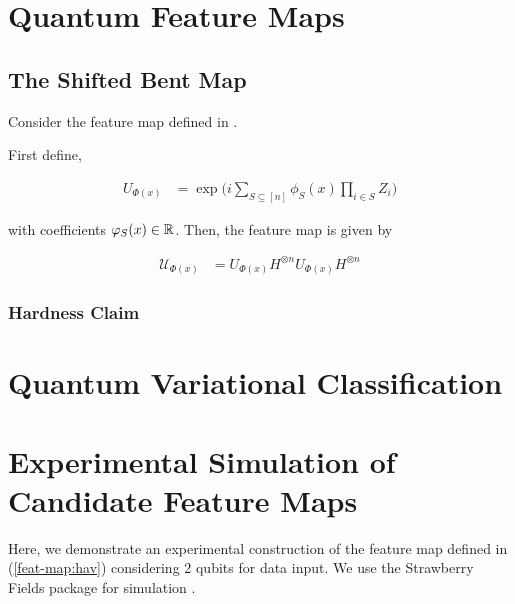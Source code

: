 \documentclass[main.tex]{subfiles}
\begin{document}
\section{Quantum Feature Maps}

\subsection{The Shifted Bent Map}

Consider the feature map defined in \cite{havlicek2018supervised}.

First define,

\begin{align*}
U_{\Phi(x)} &= \exp\Big(i \sum_{S \subseteq [n]} \phi_S(x) \prod_{i \in S} Z_i \Big)	
\end{align*}

with coefficients $\varphi_S(x) \in \mathbb{R}$. Then, the feature map is given by 


\begin{align}
\label{feat-map:hav}
\mathcal{U}_{\Phi(x)} &= U_{\Phi(x)} H^{\otimes n} U_{\Phi(x)} H^{\otimes n}
\end{align}


\subsubsection{Hardness Claim}

\section{Quantum Variational Classification}

%
%
%
\section{Experimental Simulation of Candidate Feature Maps}

Here, we demonstrate an experimental construction of the feature map defined in (\ref{feat-map:hav}) considering 2 qubits for data input. We use the Strawberry Fields package for simulation \cite{killoran2019strawberry}.
\end{document}
